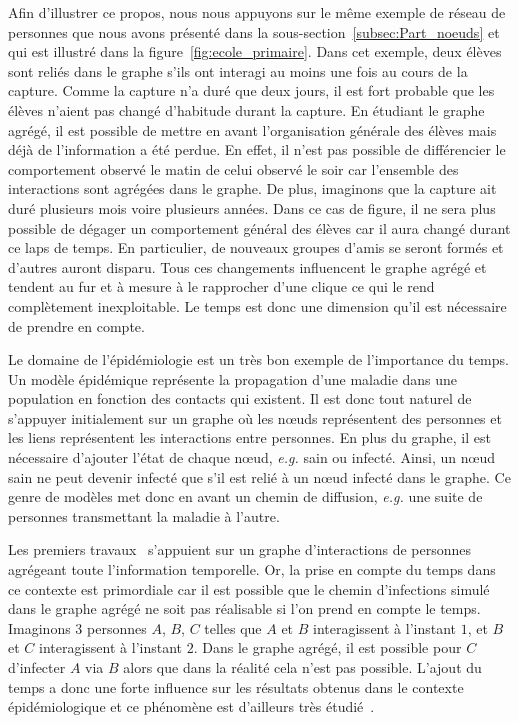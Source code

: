 Afin d'illustrer ce propos, nous nous appuyons sur le même exemple de réseau de personnes que nous avons présenté dans la sous-section~\ref{subsec:Part_noeuds} et qui est illustré dans la figure~\ref{fig:ecole_primaire}.
Dans cet exemple, deux élèves sont reliés dans le graphe s'ils ont interagi au moins une fois au cours de la capture.
Comme la capture n'a duré que deux jours, il est fort probable que les élèves n'aient pas changé d'habitude durant la capture.
En étudiant le graphe agrégé, il est possible de mettre en avant l'organisation générale des élèves mais déjà de l'information a été perdue.
En effet, il n'est pas possible de différencier le comportement observé le matin de celui observé le soir car l'ensemble des interactions sont agrégées dans le graphe.
De plus, imaginons que la capture ait duré plusieurs mois voire plusieurs années.
Dans ce cas de figure, il ne sera plus possible de dégager un comportement général des élèves car il aura changé durant ce laps de temps.
En particulier, de nouveaux groupes d'amis se seront formés et d'autres auront disparu.
Tous ces changements influencent le graphe agrégé et tendent au fur et à mesure à le rapprocher d'une clique ce qui le rend complètement inexploitable.
Le temps est donc une dimension qu'il est nécessaire de prendre en compte.

Le domaine de l'épidémiologie est un très bon exemple de l'importance du temps.
Un modèle épidémique représente la propagation d'une maladie dans une population en fonction des contacts qui existent.
Il est donc tout naturel de s'appuyer initialement sur un graphe où les n\oe{}uds représentent des personnes et les liens représentent les interactions entre personnes.
En plus du graphe, il est nécessaire d'ajouter l'état de chaque n\oe{}ud, \emph{e.g.} sain ou infecté.
Ainsi, un n\oe{}ud sain ne peut devenir infecté que s'il est relié à un n\oe{}ud infecté dans le graphe.
Ce genre de modèles met donc en avant un chemin de diffusion, \emph{e.g.} une suite de personnes transmettant la maladie à l'autre.

Les premiers travaux~\cite{pastor2001}
s'appuient sur un graphe d'interactions de personnes agrégeant toute l'information temporelle.
Or, la prise en compte du temps dans ce contexte est primordiale car il est possible que le chemin d'infections simulé dans le graphe agrégé ne soit pas réalisable si l'on prend en compte le temps.
Imaginons 3 personnes $A$, $B$, $C$ telles que $A$ et $B$ interagissent à l'instant $1$, et $B$ et $C$ interagissent à l'instant $2$.
Dans le graphe agrégé, il est possible pour $C$ d'infecter $A$ via $B$ alors que dans la réalité cela n'est pas possible.
L'ajout du temps a donc une forte influence sur les résultats obtenus dans le contexte épidémiologique et ce phénomène est d'ailleurs très étudié~\cite{Gauvin2015a,Karsai2011,Jo2014,Horvath2014,Holme2014a,Scholtes2014,Perotti2014a}.

